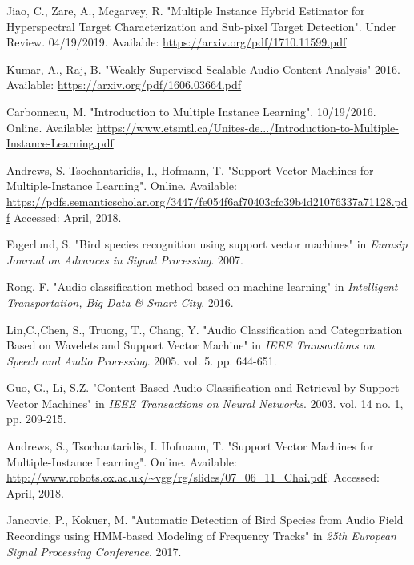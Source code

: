 \documentclass[conference]{IEEEtran}
\begin{document}
\begin{thebibliography}{00}
Jiao, C., Zare, A., Mcgarvey, R. "Multiple Instance Hybrid Estimator for Hyperspectral Target Characterization and Sub-pixel Target Detection". Under Review. 04/19/2019. Available: \url{https://arxiv.org/pdf/1710.11599.pdf}

Kumar, A., Raj, B. "Weakly Supervised Scalable Audio Content Analysis" 2016. Available: \url{https://arxiv.org/pdf/1606.03664.pdf}

Carbonneau, M. "Introduction to Multiple Instance Learning". 10/19/2016. Online. Available: \url{https://www.etsmtl.ca/Unites-de.../Introduction-to-Multiple-Instance-Learning.pdf}

Andrews, S. Tsochantaridis, I., Hofmann, T. "Support Vector Machines for Multiple-Instance Learning". Online. Available: \url{https://pdfs.semanticscholar.org/3447/fe054f6af70403cfc39b4d21076337a71128.pdf} Accessed: April, 2018.

Fagerlund, S.  "Bird species recognition using support vector machines" in \textit{Eurasip Journal on Advances in Signal Processing}. 2007. 

Rong, F. "Audio classification method based on machine learning" in \textit{Intelligent Transportation, Big Data \& Smart City}. 2016.

Lin,C.,Chen, S., Truong, T., Chang, Y. "Audio Classification and Categorization Based on Wavelets and Support Vector Machine" in \textit{IEEE Transactions on Speech and Audio Processing}. 2005. vol. 5. pp. 644-651.

Guo, G., Li, S.Z. "Content-Based Audio Classification and Retrieval by Support Vector Machines" in \textit{IEEE Transactions on Neural Networks}. 2003. vol. 14 no. 1, pp. 209-215.

Andrews, S., Tsochantaridis, I. Hofmann, T. "Support Vector Machines for Multiple-Instance Learning". Online. Available: \url{http://www.robots.ox.ac.uk/~vgg/rg/slides/07_06_11_Chai.pdf}. Accessed: April, 2018.

Jancovic, P., Kokuer, M. "Automatic Detection of Bird Species from Audio Field Recordings using HMM-based Modeling of Frequency Tracks" in \textit{25th European Signal Processing Conference}. 2017.


\end{thebibliography}
\end{document}
